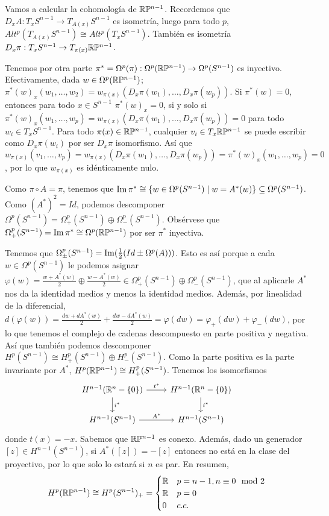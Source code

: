 \documentclass[CV.tex]{subfiles}
\begin{document}
\begin{ej}
Vamos a calcular la cohomología de $\mathbb{R}\mathbb{P}^{n-1}$. Recordemos que $D_xA:T_xS^{n-1}\to T_{A(x)}S^{n-1}$ es isometría, luego para todo $p$, $Alt^p(T_{A(x)}S^{n-1})\cong Alt^p(T_xS^{n-1})$. También es isometría $D_x\pi:T_x S^{n-1}\to T_{\pi(x)}\mathbb{R}\mathbb{P}^{n-1}$.

Tenemos por otra parte $\pi^*=\Omega^p(\pi):\Omega^p(\mathbb{R}\mathbb{P}^{n-1})\to\Omega^p(S^{n-1})$ es inyectivo. Efectivamente, dada $w\in \Omega^p(\mathbb{R}\mathbb{P}^{n-1})$; $\pi^*(w)_x(w_1,\dots, w_2)=w_{\pi(x)}(D_x\pi(w_1),\dots, D_x\pi(w_p))$. Si $\pi^*(w)=0$, entonces para todo $x\in S^{n-1}$ $\pi^*(w)_x=0$, si y solo si $\pi^*(w)_x(w_1,\dots, w_p)=w_{\pi(x)}(D_x\pi(w_1),\dots, D_x\pi(w_p))=0$ para todo $w_i\in T_x S^{n-1}$. Para todo $\pi(x)\in\mathbb{R}\mathbb{P}^{n-1}$, cualquier $v_i\in T_x\mathbb{R}\mathbb{P}^{n-1}$ se puede escribir como $D_x\pi(w_i)$ por ser $D_x\pi$ isomorfismo. Así que $w_{\pi(x)}(v_1,\dots, v_p)=w_{\pi(x)}(D_x\pi(w_1),\dots, D_x\pi(w_p))=\pi^*(w)_x(w_1,\dots, w_p)=0$, por lo que $w_{\pi(x)}$ es idénticamente nulo.

Como $\pi\circ A=\pi$, tenemos que $\operatorname{Im}\pi^*\cong \{w\in\Omega^p(S^{n-1})\mid w=A^*(w)\}\subseteq\Omega^p(S^{n-1})$. Como $(A^*)^2=Id$, podemos  descomponer $\Omega^p(S^{n-1})=\Omega^p_+(S^{n-1})\oplus \Omega^p_-(S^{n-1})$. Obsérvese que $\Omega^p_+(S^{n-1})=\operatorname{Im}\pi^*\cong \Omega^p(\mathbb{R}\mathbb{P}^{n-1})$ por ser $\pi^*$ inyectiva. 

Tenemos que $\Omega^p_\pm(S^{n-1})=\operatorname{Im}(\frac{1}{2}(Id\pm \Omega^p(A)))$. Esto es así porque a cada $w\in \Omega^p(S^{n-1})$ le podemos asignar $\varphi(w)=\frac{w+A^*(w)}{2}\oplus \frac{w-A^*(w)}{2}\in\Omega^p_+(S^{n-1})\oplus\Omega^p_-(S^{n-1})$, que al aplicarle $A^*$ nos da la identidad medios y menos la identidad medios. Además, por linealidad de la diferencial, $d(\varphi(w))=\frac{dw+dA^*(w)}{2}+\frac{dw-dA^*(w)}{2}=\varphi(dw)=\varphi_+(dw) +\varphi_-(dw)$, por lo que tenemos el complejo de cadenas descompuesto en parte positiva y negativa. Así que también podemos descomponer $H^p(S^{n-1})\cong H^p_+(S^{n-1})\oplus H^p_-(S^{n-1})$.  Como la parte positiva es la parte invariante por $A^*$, $H^p(\mathbb{R}\mathbb{P}^{n-1})\cong H^p_+(S^{n-1})$.  Tenemos los isomorfismos
\[
\begin{tikzcd}
H^{n-1}(\R^n-\{0\})\arrow[r,"t^*"]\arrow[d, "i^*"] & H^{n-1}(\R^n-\{0\})\arrow[d, "i^*"]\\
H^{n-1}(S^{n-1})\arrow[r, "A^*"] & H^{n-1}(S^{n-1})
\end{tikzcd}
\]
donde $t(x)=-x$. Sabemos que $\mathbb{R}\mathbb{P}^{n-1}$ es conexo. Además, dado un generador $[z]\in H^{n-1}(S^{n-1})$, si $A^*([z])=-[z]$ entonces no está en la clase del proyectivo, por lo que solo lo estará si $n$ es par. En resumen,
\[
H^p(\mathbb{R}\mathbb{P}^{n-1})\cong H^p(S^{n-1})_+=\begin{cases}
\mathbb{R} & p=n-1, n\equiv 0\mod 2\\
\mathbb{R} & p=0\\
0 & c.c.
\end{cases}
\]
\end{ej}
\end{document}
